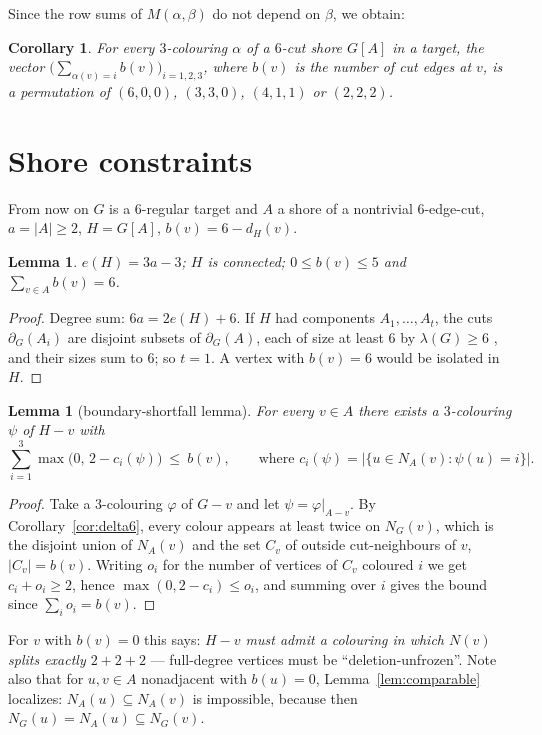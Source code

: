 \documentclass[11pt]{article}
\newtheorem{lemma}[theorem]{Lemma}
\newtheorem{corollary}[theorem]{Corollary}
\theoremstyle{remark}
\newcommand{\NA}{N_A}
\begin{document}
Since the row sums of $M(\alpha,\beta)$ do not depend on $\beta$, we obtain:

\begin{corollary}\label{cor:rowsum}
For every $3$-colouring $\alpha$ of a $6$-cut shore $G[A]$ in a target, the vector
$\bigl(\sum_{\alpha(v)=i} b(v)\bigr)_{i=1,2,3}$, where $b(v)$ is the number of cut
edges at $v$, is a permutation of $(6,0,0)$, $(3,3,0)$, $(4,1,1)$ or $(2,2,2)$.
\end{corollary}

\section{Shore constraints}\label{sec:shores}

From now on $G$ is a $6$-regular target and $A$ a shore of a nontrivial
$6$-edge-cut, $a=|A|\ge 2$, $H=G[A]$, $b(v)=6-d_H(v)$.

\begin{lemma}\label{lem:basic}
$e(H)=3a-3$; $H$ is connected; $0\le b(v)\le 5$ and $\sum_{v\in A}b(v)=6$.
\end{lemma}

\begin{proof}
Degree sum: $6a=2e(H)+6$. If $H$ had components $A_1,\dots,A_t$, the cuts
$\partial_G(A_i)$ are disjoint subsets of $\partial_G(A)$, each of size at least
$6$ by $\lambda(G)\ge 6$ \cite{SkSt25}, and their sizes sum to $6$; so $t=1$.
A vertex with $b(v)=6$ would be isolated in $H$.
\end{proof}

\begin{lemma}[boundary-shortfall lemma]\label{lem:shortfall}
For every $v\in A$ there exists a $3$-colouring $\psi$ of $H-v$ with
\[
\sum_{i=1}^{3}\max\bigl(0,\,2-c_i(\psi)\bigr)\ \le\ b(v),
\qquad\text{where } c_i(\psi)=|\{u\in \NA(v):\psi(u)=i\}|.
\]
\end{lemma}

\begin{proof}
Take a $3$-colouring $\varphi$ of $G-v$ and let $\psi=\varphi|_{A-v}$. By
Corollary~\ref{cor:delta6}, every colour appears at least twice on $N_G(v)$,
which is the disjoint union of $\NA(v)$ and the set $C_v$ of outside
cut-neighbours of $v$, $|C_v|=b(v)$. Writing $o_i$ for the number of vertices of
$C_v$ coloured $i$ we get $c_i+o_i\ge 2$, hence
$\max(0,2-c_i)\le o_i$, and summing over $i$ gives the bound since
$\sum_i o_i=b(v)$.
\end{proof}

For $v$ with $b(v)=0$ this says: \emph{$H-v$ must admit a colouring in which
$N(v)$ splits exactly $2+2+2$} --- full-degree vertices must be
``deletion-unfrozen''. Note also that for $u,v\in A$ nonadjacent with $b(u)=0$,
Lemma~\ref{lem:comparable} localizes: $\NA(u)\subseteq \NA(v)$ is impossible,
because then $N_G(u)=\NA(u)\subseteq N_G(v)$.
\end{document}
